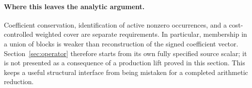\paragraph{Where this leaves the analytic argument.}
Coefficient conservation, identification of active nonzero occurrences, and a cost-controlled weighted cover are separate requirements. In particular, membership in a union of blocks is weaker than reconstruction of the signed coefficient vector. Section~\ref{sec:operator} therefore starts from its own fully specified source scalar; it is not presented as a consequence of a production lift proved in this section. This keeps a useful structural interface from being mistaken for a completed arithmetic reduction.
